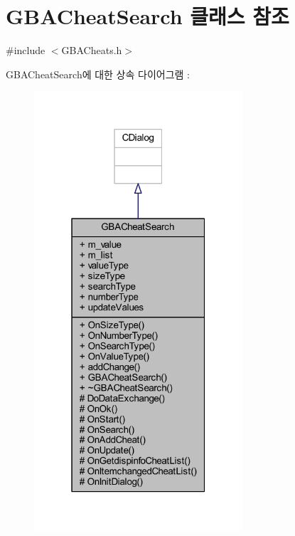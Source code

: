 \hypertarget{class_g_b_a_cheat_search}{}\section{G\+B\+A\+Cheat\+Search 클래스 참조}
\label{class_g_b_a_cheat_search}


{\ttfamily \#include $<$G\+B\+A\+Cheats.\+h$>$}



G\+B\+A\+Cheat\+Search에 대한 상속 다이어그램 \+: \nopagebreak
\begin{figure}[H]
\begin{center}
\leavevmode
\includegraphics[width=220pt]{class_g_b_a_cheat_search__inherit__graph}
\end{center}
\end{figure}


